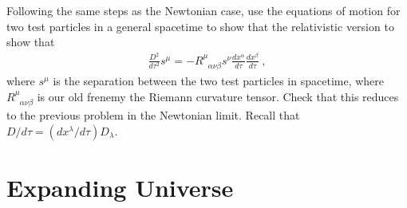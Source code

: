 \documentclass[12pt]{article}
\numberwithin{equation}{section}    %
\begin{document}
Following the same steps as the Newtonian case, use the equations of motion for two test particles in a general spacetime to show that the relativistic version to show that
\begin{align}
	\frac{D^2}{d\tau^2} s^\mu 
	=
	-R^{\mu}_{\phantom{\mu}\alpha\nu\beta}
	s^\nu 
	\frac{dx^\alpha}{d\tau}
	\frac{dx^\beta}{d\tau} \ ,
\end{align}
where $s^\mu$ is the separation between the two test particles in spacetime, where $R^{\mu}_{\phantom{\mu}\alpha\nu\beta}$ is our old frenemy the Riemann curvature tensor. Check that this reduces to the previous problem in the Newtonian limit. Recall that $D/d\tau = (dx^\lambda/d\tau) D_\lambda$.

\section{Expanding Universe}

\end{document}
